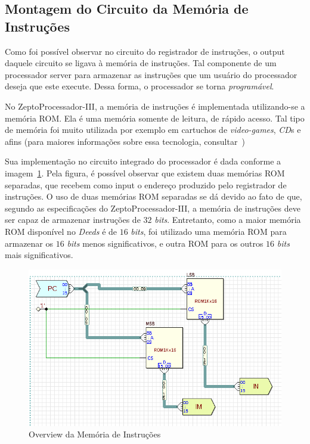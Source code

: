 \documentclass[12pt]{article}
\begin{document}
\subsection{Montagem do Circuito da Memória de Instruções}\label{sec:2.2}

Como foi possível observar no circuito do registrador de instruções, o output
daquele circuito se ligava à memória de instruções. Tal componente de um
processador server para armazenar as instruções que um usuário do processador
deseja que este execute. Dessa forma, o processador se torna \emph{programável}.

No ZeptoProcessador-III, a memória de instruções é implementada utilizando-se a
memória ROM. Ela é uma memória somente de leitura, de rápido acesso. Tal tipo de
memória foi muito utilizada por exemplo em cartuchos de \emph{video-games},
\emph{CD}s e afins (para maiores informações sobre essa tecnologia,
consultar~\cite{ROM_memory})

Sua implementação no circuito integrado do processador é dada conforme a
imagem~\ref{fig:circuit__ROM_memory.png}. Pela figura, é possível observar que
existem duas memórias ROM separadas, que recebem como input o endereço produzido
pelo registrador de instruções. O uso de duas memórias ROM separadas se dá
devido ao fato de que, segundo as especificações do ZeptoProcessador-III, a
memória de instruções deve ser capaz de armazenar instruções de $32$
\emph{bits}. Entretanto, como a maior memória ROM disponível no \emph{Deeds} é
de $16$ \emph{bits}, foi utilizado uma memória ROM para armazenar os $16$
\emph{bits} menos significativos, e outra ROM para os outros $16$ \emph{bits}
mais significativos.

\begin{figure}[H]
    \centering
    \includegraphics[width=.9\textwidth]{Projeto/images/circuit__ROM_memory.png}
    \caption{Overview da Memória de Instruções}\label{fig:circuit__ROM_memory.png}
\end{figure}
\end{document}
